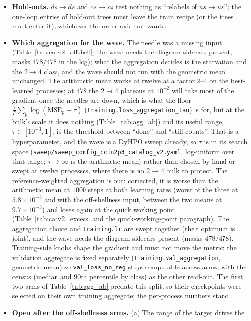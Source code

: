 \documentclass[11pt]{article}
\newcommand{\code}[1]{\texttt{#1}}
\begin{document}
\begin{itemize}
    observations under the old target and without the $\tau$ dimension.
  \item \textbf{Hold-outs.} $ds\to ds$ and $cs\to cs$ test nothing as ``relabels of $us\to
    us$''; the one-loop entries of hold-out trees must leave the train recipe (or the trees
    must enter it), whichever the order-axis test wants.
  \item \textbf{Which aggregation for the wave.} The needle was a missing input
    (Table~\ref{tab:catv2_offshell}; the wave needs the diagram sidecars present, masks
    $478/478$ in the log); what the aggregation decides is the starvation and the
    $2\to4$ class, and the wave should not run with the geometric mean unchanged. The arithmetic mean works at twelve at a factor $2$--$4$ on the
    best-learned processes; at $478$ the $2\to4$ plateaus at $10^{-2}$ will take most of the
    gradient once the needles are down, which is what the floor
    $\frac1P\sum_p\log(\mathrm{MSE}_p+\tau)$ (\code{training.loss\_aggregation\_tau}) is
    for, but at the bulk's scale it does nothing (Table~\ref{tab:agg_ab}) and its useful
    range, $\tau\in[10^{-3},1]$, is the threshold between ``done'' and ``still counts''.
    That is a hyperparameter, and the wave is a DyHPO sweep already, so $\tau$ is in its
    search space (\code{sweep/sweep\_config\_ccin2p3\_catalog\_v2.yaml}, log-uniform over
    that range; $\tau\to\infty$ is the arithmetic mean) rather than chosen by hand or swept
    at twelve processes, where there is no $2\to4$ bulk to protect. The reference-weighted
    aggregation is out: corrected, it is worse than the arithmetic mean at $1000$ steps at both
    learning rates (worst of the three at $5.8\times10^{-3}$ and with the off-shellness input,
    between the two means at $9.7\times10^{-3}$) and loses again at the quick working point
    (Table~\ref{tab:catv2_excess} and the quick-working-point paragraph). The aggregation choice and \code{training.lr} are swept
    together (their optimum is joint), and the wave needs the diagram sidecars present
    (masks $478/478$). Training-side knobs shape the gradient and must not move the
    metric: the validation aggregate is fixed separately
    (\code{training.val\_aggregation}, geometric mean) so \code{val\_loss\_no\_reg} stays
    comparable across arms, with the census (median and $90$th percentile by class) as the other read-out.
    The first two arms of Table~\ref{tab:agg_ab} predate this split, so their checkpoints
    were selected on their own training aggregate; the per-process numbers stand.
  \item \textbf{Open after the off-shellness arms.} (a) The range of the target drives the

\end{itemize}
\end{document}
